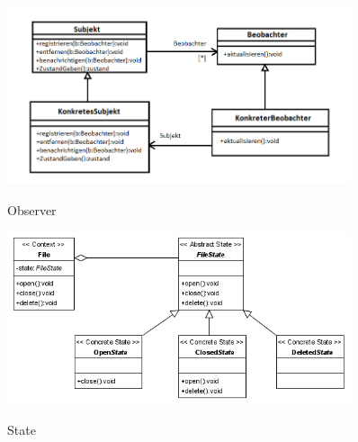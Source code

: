 \begin{figure}[htb]
    \centering
    \begin{minipage}[t]{0.45\linewidth}
		\centering
		\includegraphics[width=0.9\textwidth]{images/observer}
		\label{fig:observer}
		\caption{Observer}
	\end{minipage}%
	\hfill
    \begin{minipage}[t]{0.45\linewidth}
		\centering
		\includegraphics[width=0.9\textwidth]{images/state}
		\label{fig:state}
		\caption{State}
	\end{minipage}
\end{figure}

